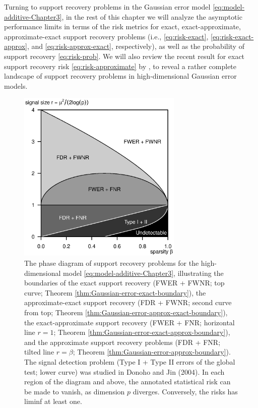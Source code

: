 



Turning to support recovery problems in the Gaussian error model \eqref{eq:model-additive-Chapter3}, in the rest of this chapter
we will analyze the asymptotic performance limits in terms of the risk metrics for exact, exact-approximate, approximate-exact support recovery problems (i.e., \eqref{eq:risk-exact}, \eqref{eq:risk-exact-approx}, and \eqref{eq:risk-approx-exact}, respectively), as well as the probability of support recovery
\eqref{eq:risk-prob}.  We will also review the recent result for exact support recovery risk \eqref{eq:risk-approximate} by \cite{arias2017distribution}, to 
reveal a rather complete landscape of support recovery problems in high-dimensional Gaussian error models.


\begin{figure}
  \begin{center}
    \includegraphics[width=0.7\textwidth]{./figures/theoretical_boundaries/phase_diagram_Gaussian_ALL_boundaries.eps}
  \end{center}
   \caption{The phase diagram of support recovery problems for the high-dimensional model \eqref{eq:model-additive-Chapter3}, illustrating the boundaries of the exact support recovery (FWER + FWNR; top curve; Theorem \ref{thm:Gaussian-error-exact-boundary}), the approximate-exact support recovery (FDR + FWNR; second curve from top; Theorem \ref{thm:Gaussian-error-approx-exact-boundary}), the exact-approximate support recovery (FWER + FNR; horizontal line $r=1$; Theorem \ref{thm:Gaussian-error-exact-approx-boundary}), and the approximate support recovery problems (FDR + FNR; tilted line $r=\beta$; Theorem \ref{thm:Gaussian-error-approx-boundary}). The signal detection problem (Type I + Type II errors of the global test; lower curve) was studied in Donoho and Jin (2004). In each region of the diagram and above, the annotated statistical risk can be made to vanish, as dimension $p$ diverges. Conversely, the risks has liminf at least one.}
   \label{fig:phase-Gaussian-errors}
\end{figure}

